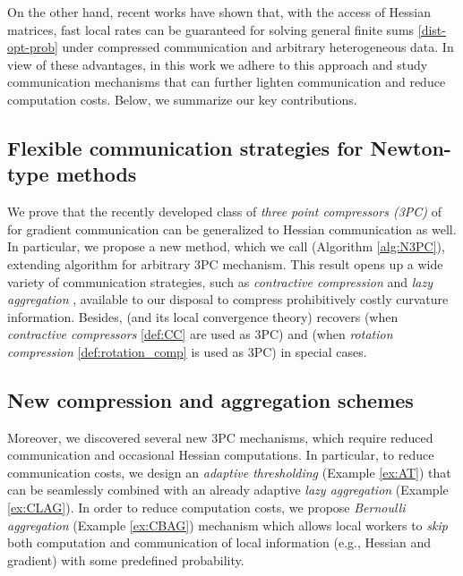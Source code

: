 \documentclass[11pt]{article}
\begin{document}
	On the other hand, recent works \citep{FedNL2021,qian2021basis} have shown that, with the access of Hessian matrices, fast local rates can be guaranteed for solving general finite sums \eqref{dist-opt-prob} under compressed communication and arbitrary heterogeneous data. In view of these advantages, in this work we adhere to this approach and study communication mechanisms that can further lighten communication and reduce computation costs. Below, we summarize our key contributions.
	
	\subsection{Flexible communication strategies for Newton-type methods}
	We prove that the recently developed class of {\em three point compressors (3PC)} of \citet{richtarik3PC} for gradient communication can be generalized to Hessian communication as well. In particular, we propose a new method, which we call  (Algorithm \ref{alg:N3PC}), extending  \citep{FedNL2021} algorithm for arbitrary 3PC mechanism. This result opens up a wide variety of communication strategies, such as {\em contractive compression} \citep{StichNIPS2018-memory,Alistarh-SparsGradMethods2018,Karimireddy2019EFsignSGD} and {\em lazy aggregation} \citep{Chen2018LAG,Sun2019LAG,Ghadikolaei2021LENA}, available to our disposal to compress prohibitively costly curvature information. Besides,  (and its local convergence theory) recovers \citep{FedNL2021} (when {\em contractive compressors} \eqref{def:CC} are used as 3PC) and  \citep{qian2021basis} (when {\em rotation compression} \eqref{def:rotation_comp} is used as 3PC) in special cases.
	
	
	\subsection{New compression and aggregation schemes}
	Moreover, we discovered several new 3PC mechanisms, which require reduced communication and occasional Hessian computations. In particular, to reduce communication costs, we design an {\em adaptive thresholding} (Example \ref{ex:AT}) that can be seamlessly combined with an already adaptive {\em lazy aggregation} (Example \ref{ex:CLAG}). In order to reduce computation costs, we propose {\em Bernoulli aggregation} (Example \ref{ex:CBAG}) mechanism which allows local workers to {\em skip} both computation and communication of local information (e.g., Hessian and gradient) with some predefined probability.
	
\end{document}

